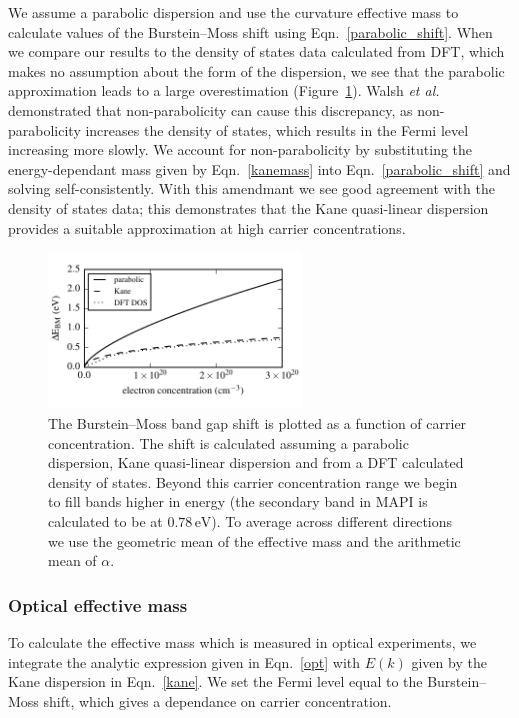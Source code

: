 We assume a parabolic dispersion and use the curvature effective mass to calculate values of the Burstein--Moss shift using Eqn.\ \ref{parabolic_shift}. When we compare our results to the density of states data calculated from DFT, which makes no assumption about the form of the dispersion, we see that the parabolic approximation leads to a large overestimation (Figure\ \ref{burstein_moss_plot}). 
Walsh \textit{et al.}\autocite{Walsh2008} demonstrated that non-parabolicity can cause this discrepancy, as
non-parabolicity increases the density of states, which results in the Fermi level increasing more slowly. 
We account for non-parabolicity by substituting the energy-dependant mass given by Eqn.\ \ref{kanemass} into Eqn.\ \ref{parabolic_shift} and solving self-consistently.
With this amendmant we see good agreement with the density of states data; this demonstrates that the Kane quasi-linear dispersion provides a suitable approximation at high carrier concentrations.

\begin{figure}[tb] \centering
\includegraphics[width=0.6\textwidth]{./figures/ch4/burstein_moss_MAPI_hybrid_SoC.pdf}
\caption[Burstein--Moss band gap shift]{\label{burstein_moss_plot} The Burstein--Moss band gap shift is plotted as a function of carrier concentration. The shift is calculated assuming a parabolic dispersion, Kane quasi-linear dispersion and from a DFT calculated density of states. Beyond this carrier concentration range we begin to fill bands higher in energy (the secondary band in MAPI is calculated to be at $0.78\,\mathrm{eV}$). To average across different directions we use the geometric mean of the effective mass and the arithmetic mean of $\alpha$.}
\end{figure}

\subsubsection{Optical effective mass}

To calculate the effective mass which is measured in optical experiments, we integrate the analytic expression given in Eqn.\ \ref{opt} with $E(k)$ given by the Kane dispersion in Eqn.\ \ref{kane}. 
We set the Fermi level equal to the Burstein--Moss shift, which gives a dependance on carrier concentration. 

